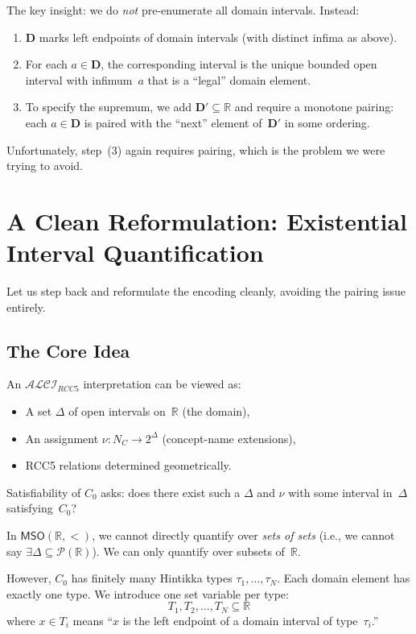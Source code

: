 \documentclass[a4paper,11pt]{article}
\theoremstyle{definition}
\newcommand{\ALCIRCC}[1]{\ensuremath{\mathcal{ALCI}_{\mathit{RCC#1}}}}
\newcommand{\NC}{\ensuremath{N_C}}
\newcommand{\MSO}{\ensuremath{\mathsf{MSO}}}
\newcommand{\reals}{\ensuremath{\mathbb{R}}}
\begin{document}
The key insight: we do \emph{not} pre-enumerate all domain intervals.
Instead:
\begin{enumerate}[nosep]
  \item $\mathbf{D}$ marks left endpoints of domain intervals (with
    distinct infima as above).
  \item For each $a \in \mathbf{D}$, the corresponding interval is
    the unique bounded open interval with infimum~$a$ that is a
    ``legal'' domain element.
  \item To specify the supremum, we add $\mathbf{D'} \subseteq
    \reals$ and require a monotone pairing: each $a \in \mathbf{D}$
    is paired with the ``next'' element of~$\mathbf{D'}$ in some
    ordering.
\end{enumerate}

Unfortunately, step~(3) again requires pairing, which is the
problem we were trying to avoid.

\section{A Clean Reformulation: Existential Interval Quantification}
\label{sec:clean}

Let us step back and reformulate the encoding cleanly, avoiding the
pairing issue entirely.

\subsection{The Core Idea}

An $\ALCIRCC{5}$ interpretation can be viewed as:
\begin{itemize}[nosep]
  \item A set $\Delta$ of open intervals on~$\reals$ (the domain),
  \item An assignment $\nu : \NC \to 2^{\Delta}$ (concept-name
    extensions),
  \item RCC5 relations determined geometrically.
\end{itemize}

Satisfiability of $C_0$ asks: does there exist such a $\Delta$ and
$\nu$ with some interval in~$\Delta$ satisfying~$C_0$?

In $\MSO(\reals, <)$, we cannot directly quantify over \emph{sets of
sets} (i.e., we cannot say $\exists \Delta \subseteq
\mathcal{P}(\reals)$). We can only quantify over subsets
of~$\reals$.

However, $C_0$ has finitely many Hintikka types $\tau_1, \ldots,
\tau_N$.  Each domain element has exactly one type.  We introduce
one set variable per type:
\[
  T_1, T_2, \ldots, T_N \subseteq \reals
\]
where $x \in T_i$ means ``$x$ is the left endpoint of a domain
interval of type~$\tau_i$.''
\end{document}
